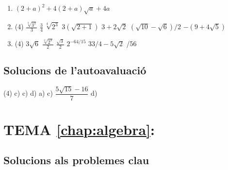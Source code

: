 \begin{enumerate}
	\item[\clauref{t1-r9}] $(2+a)^{2} +4(2+a)\sqrt{a} +4a$
	
	
	\item[\clauref{t1-r6}]  
	\begin{tasks}(4)
	\task  $\frac{\sqrt[{3}]{3^{2} } }{3} $ \task  $\frac{3}{4} \, \sqrt[{4}]{2^{3} } $ \task  $3(\sqrt{2+1} )$ \task  $3+2\sqrt{2} $  \task  $(\sqrt{10} -\sqrt{6} )/2$   \task  $-(9+4\sqrt{5} )$
\end{tasks}
	
	\item[\clauref{t1-r8}] 
	\begin{tasks}(4)
	\task  $3\sqrt{6} $     \task  $\frac{\sqrt[{4}]{2^{3} } }{2} $    \task  $\frac{\sqrt{3} }{2} $         \task  $2^{-64/15} $   \task  $33/4-5\sqrt{2} $    /56
\end{tasks}
\end{enumerate}


\subsection*{Solucions de l'autoavaluació}

\begin{tasks}[style=enumerate,label-width=4ex](4)
	\task c)
	\task c)
	\task d)
	\task a)
	\task c)
	\task $\dfrac{5\sqrt{15}-16}{7}$
	\task d)
\end{tasks}


\section*{TEMA \ref{chap:algebra}: }

\subsection*{Solucions als problemes clau \simbolclau}


